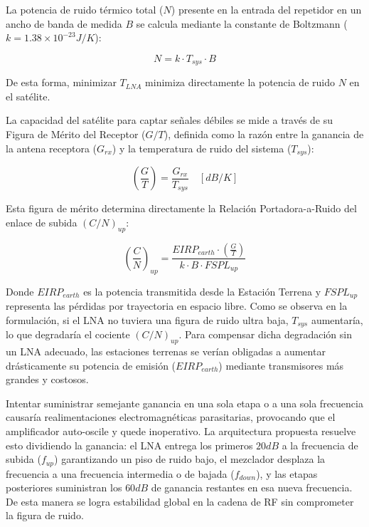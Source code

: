 \documentclass[11pt,a4paper,twoside]{report}
\begin{document}
	La potencia de ruido térmico total ($N$) presente en la entrada del repetidor en un ancho de banda de medida $B$ se calcula mediante la constante de Boltzmann ($k = 1.38 \times 10^{-23}J/K$):
	
	\begin{equation}
		N = k \cdot T_{sys} \cdot B
	\end{equation}
	
	De esta forma, minimizar $T_{LNA}$ minimiza directamente la potencia de ruido $N$ en el satélite.
	
	La capacidad del satélite para captar señales débiles se mide a través de su Figura de Mérito del Receptor ($G/T$), definida como la razón entre la ganancia de la antena receptora ($G_{rx}$) y la temperatura de ruido del sistema ($T_{sys}$):
	
	\begin{equation}
		\left(\frac{G}{T}\right) = \frac{G_{rx}}{T_{sys}} \quad [dB/K]
	\end{equation}
	
	Esta figura de mérito determina directamente la Relación Portadora-a-Ruido del enlace de subida $(C/N)_{up}$:
	
	\begin{equation}
		\left(\frac{C}{N}\right)_{up} = \frac{EIRP_{earth} \cdot \left(\frac{G}{T}\right)}{k \cdot B \cdot FSPL_{up}}
	\end{equation}
	
	Donde $EIRP_{earth}$ es la potencia transmitida desde la Estación Terrena y $FSPL_{up}$ representa las pérdidas por trayectoria en espacio libre. Como se observa en la formulación, si el LNA no tuviera una figura de ruido ultra baja, $T_{sys}$ aumentaría, lo que degradaría el cociente $(C/N)_{up}$. Para compensar dicha degradación sin un LNA adecuado, las estaciones terrenas se verían obligadas a aumentar drásticamente su potencia de emisión ($EIRP_{earth}$) mediante transmisores más grandes y costosos.
	
	Intentar suministrar semejante ganancia en una sola etapa o a una sola frecuencia causaría realimentaciones electromagnéticas parasitarias, provocando que el amplificador auto-oscile y quede inoperativo. La arquitectura propuesta resuelve esto dividiendo la ganancia: el LNA entrega los primeros $20dB$ a la frecuencia de subida ($f_{up}$) garantizando un piso de ruido bajo, el mezclador desplaza la frecuencia a una frecuencia intermedia o de bajada ($f_{down}$), y las etapas posteriores suministran los $60dB$ de ganancia restantes en esa nueva frecuencia. De esta manera se logra estabilidad global en la cadena de RF sin comprometer la figura de ruido.
	
\end{document}
